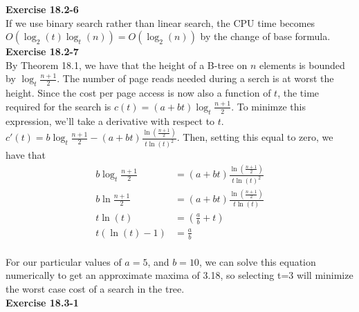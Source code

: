 \documentclass{article}
\begin{document}
\noindent\textbf{Exercise 18.2-6}\\

If we use binary search rather than linear search, the CPU time becomes $O(\log_2(t)\log_t(n)) = O(\log_2(n))$ by the change of base formula.\\

\noindent\textbf{Exercise 18.2-7}\\

By Theorem 18.1, we have that the height  of a B-tree on $n$ elements is bounded by $\log_t \frac{n+1}{2}$. The number of page reads needed during a serch is at worst the height. Since the cost per page access is now also a function of $t$, the time required for the search is $c(t) = (a+bt)\log_t \frac{n+1}{2}$. To minimze this expression, we'll take a derivative with respect to $t$. $c'(t) = b \log_t\frac{n+1}{2} - (a+bt) \frac{\ln\left(\frac{n+1}{2}\right)}{t \ln(t)^2}$. Then, setting this equal to zero, we have that 
\begin{align*}
b \log_t\frac{n+1}{2} &= (a+bt) \frac{\ln\left(\frac{n+1}{2}\right)}{t \ln(t)^2}\\
b \ln\frac{n+1}{2} &= (a+bt) \frac{\ln\left(\frac{n+1}{2}\right)}{t \ln(t)}\\
t\ln(t) &=(\frac{a}{b} +t)\\
t(\ln(t)-1) &= \frac{a}{b}\\
\end{align*}

For our particular values of $a=5$, and $b=10$, we can solve this equation numerically to get an approximate maxima of 3.18, so selecting t=3 will minimize the worst case cost of a search in the tree.\\



\noindent\textbf{Exercise 18.3-1}\\


\end{document}
